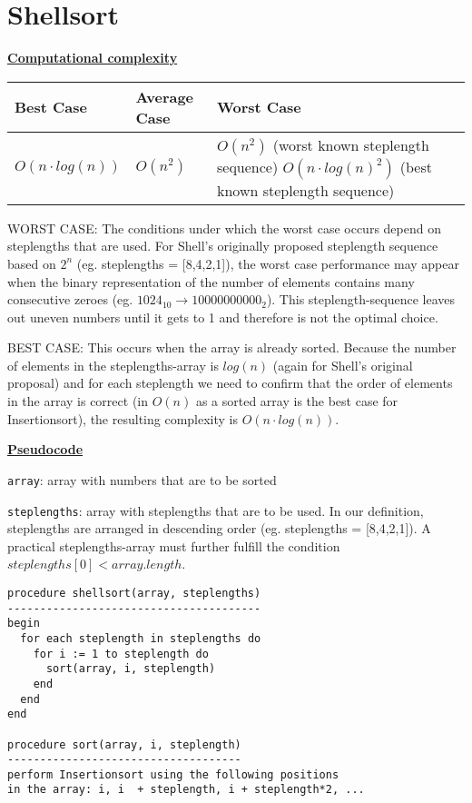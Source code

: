 \documentclass[a4paper]{report}
\begin{document}
\chapter*{Shellsort}

\underline{\bf{Computational complexity}}

\begin{tabular}{|l|l|p{7cm} l |}
\hline
Best Case    & Average Case  &  Worst Case\\ \hline
$O(n\cdot log(n))$ & $O(n^2)$  &  $O(n^2)$ (worst known steplength sequence) $O(n\cdot log(n)^2)$ (best known steplength sequence) \\ \hline
\end{tabular}

WORST CASE: The conditions under which the worst case occurs depend on steplengths that are used. For Shell's originally proposed steplength sequence based on $2^n$ (eg. steplengths = [8,4,2,1]), the worst case performance may appear when the binary representation of the number of elements contains many consecutive zeroes (eg. $1024_{10} \rightarrow 10000000000_2$). This steplength-sequence leaves out uneven numbers until it gets to 1 and therefore is not the optimal choice.

BEST CASE: This occurs when the array is already sorted. Because the number of elements in the steplengths-array is $log(n)$ (again for Shell's original proposal) and for each steplength we need to confirm that the order of elements in the array is correct (in $O(n)$ as a sorted array is the best case for Insertionsort), the resulting complexity is $O(n \cdot log(n))$.


\underline{\bf{Pseudocode}}

\texttt{array}: array with numbers that are to be sorted

\texttt{steplengths}: array with steplengths that are to be used. In our definition, steplengths are arranged in descending order (eg. steplengths = [8,4,2,1]). A practical steplengths-array must further fulfill the condition $steplengths[0] < array.length$. 


\begin{lstlisting}
procedure shellsort(array, steplengths)
---------------------------------------
begin
  for each steplength in steplengths do
    for i := 1 to steplength do
  	  sort(array, i, steplength)   
    end
  end
end

procedure sort(array, i, steplength)
------------------------------------
perform Insertionsort using the following positions
in the array: i, i  + steplength, i + steplength*2, ...

\end{lstlisting}
\end{document}
